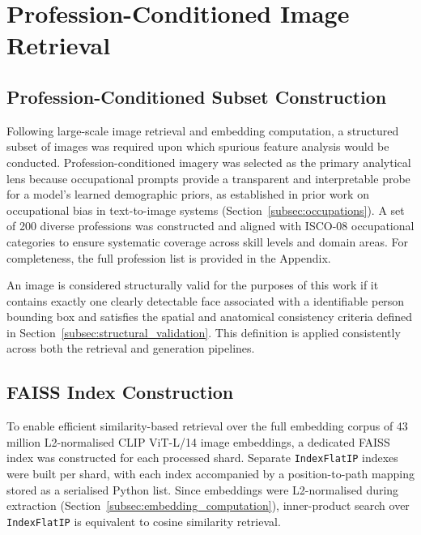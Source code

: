 
\section{Profession-Conditioned Image Retrieval}

\subsection{Profession-Conditioned Subset Construction}
\label{subsec:profession_subset_construction}

Following large-scale image retrieval and embedding computation, a
structured subset of images was required upon which spurious feature
analysis would be conducted. Profession-conditioned imagery was selected as
the primary analytical lens because occupational prompts provide a
transparent and interpretable probe for a model's learned demographic
priors, as established in prior work on occupational bias in text-to-image
systems (Section~\ref{subsec:occupations}). A set of 200 diverse
professions was constructed and aligned with ISCO-08 occupational
categories to ensure systematic coverage across skill levels and domain
areas. For completeness, the full profession list is provided in the
Appendix.

An image is considered structurally valid for the purposes of this work if
it contains exactly one clearly detectable face associated with a
identifiable person bounding box and satisfies the spatial and anatomical
consistency criteria defined in Section~\ref{subsec:structural_validation}.
This definition is applied consistently across both the retrieval and
generation pipelines.

\subsection{FAISS Index Construction}
\label{subsec:faiss_index}

To enable efficient similarity-based retrieval over the full embedding
corpus of 43 million L2-normalised CLIP ViT-L/14 image embeddings, a
dedicated FAISS index was constructed for each processed shard. Separate
\texttt{IndexFlatIP} indexes were built per shard, with each index
accompanied by a position-to-path mapping stored as a serialised Python
list. Since embeddings were L2-normalised during extraction
(Section~\ref{subsec:embedding_computation}), inner-product search over
\texttt{IndexFlatIP} is equivalent to cosine similarity retrieval.

